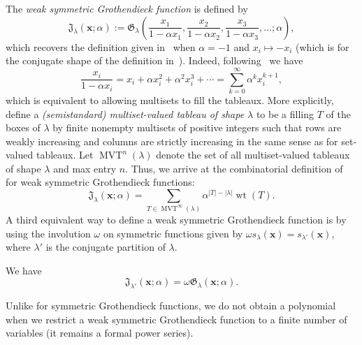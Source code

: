 \documentclass[ALCO,ThmDefs,Unicode,epreuves]{cedram}
\renewcommand{\G}{\mathfrak{G}}  %
\newcommand{\wG}{\mathfrak{J}}  %
\newcommand{\xx}{\mathbf{x}}
\newcommand{\abs}[1]{\lvert #1 \rvert}
\DeclareMathOperator{\wt}{wt} %
\DeclareMathOperator{\mvt}{MVT} %
\newcommand{\defn}[1]{{\color{darkred}\emph{#1}}} %
\begin{document}
The \defn{weak symmetric Grothendieck function} is defined by
\begin{equation}
\label{eq:weak_definition}
\wG_{\lambda}(\xx; \alpha) := \G_{\lambda}\left( \frac{x_1}{1-\alpha x_1}, \frac{x_2}{1-\alpha x_2}, \frac{x_3}{1-\alpha x_3}, \ldots; \alpha \right),
\end{equation}
which recovers the definition given in~\cite[Thm.~6.11]{PP16} when $\alpha = -1$ and $x_i \mapsto -x_i$ (which is for the conjugate shape of the definition in~\cite{LamPyl07}).
Indeed, following~\cite{PP16} we have
\[
\frac{x_i}{1 - \alpha x_i} = x_i + \alpha x_i^2 + \alpha^2 x_i^3 + \cdots = \sum_{k=0}^{\infty} \alpha^k x_i^{k+1},
\]
which is equivalent to allowing multisets to fill the tableaux.
More explicitly, define a \defn{(semistandard) multiset-valued tableau of shape $\lambda$} to be a filling $T$ of the boxes of $\lambda$ by finite nonempty multisets of positive integers such that rows are weakly increasing and columns are strictly increasing in the same sense as for set-valued tableaux.
Let $\mvt^n(\lambda)$ denote the set of all multiset-valued tableaux of shape $\lambda$ and max entry $n$.
Thus, we arrive at the combinatorial definition of~\cite{LamPyl07} for weak symmetric Grothendieck functions:
\[
\wG_{\lambda}(\xx; \alpha) = \sum_{T \in \mvt^{\infty}(\lambda)} \alpha^{\abs{T}-\abs{\lambda}} \wt(T).
\]
A third equivalent way to define a weak symmetric Grothendieck function is by using the involution $\omega$ on symmetric functions given by $\omega s_{\lambda}(\xx) = s_{\lambda'}(\xx)$, where $\lambda'$ is the conjugate partition of $\lambda$.

\begin{prop}
\label{prop:conjugate_defn}
We have
\[
\wG_{\lambda'}(\xx; \alpha) = \omega \G_{\lambda}(\xx; \alpha).
\]
\end{prop}

Unlike for symmetric Grothendieck functions, we do not obtain a polynomial when we restrict a weak symmetric Grothendieck function to a finite number of variables (\ie it remains a formal power series).
\end{document}
